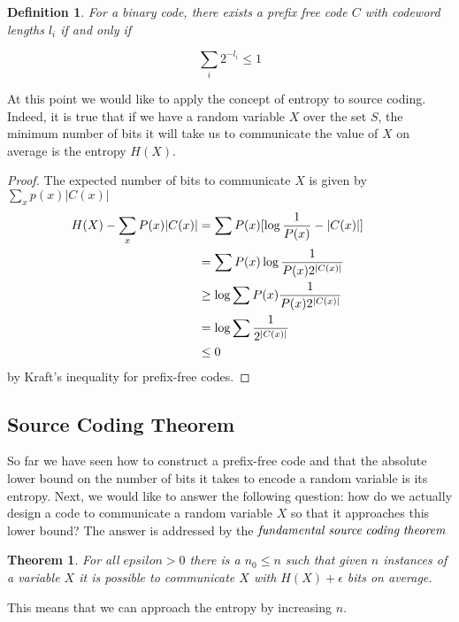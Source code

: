 \documentclass[a4paper,11pt]{book}
\newtheorem{theorem}{Theorem}
\newtheorem{definition}{Definition}
\begin{document}
\begin{definition}
For a binary code, there exists a prefix free code $C$ with codeword lengths $l_{i}$ if and only if
\end{definition}

\begin{equation}
\sum_{i} 2^{-l_{i}} \leq 1
\end{equation}

At this point we would like to apply the concept of entropy to source coding. Indeed, it is true that if we have a random variable $X$ over the set $S$, the minimum number of bits it will take us to communicate the value of $X$ on average is the entropy $H(X)$.

\begin{proof}
  The expected number of bits to communicate $X$ is given by $\sum_{x}p(x)|C(x)|$
  \begin{align*}
    H(X) - \sum_{x}P(x)|C(x)| &= \sum P(x)[\log\frac{1}{P(x)} - |C(x)|] \\
    &= \sum P(x)\log\frac{1}{P(x)2^{|C(x)|}} \\
    &\geq \log\sum P(x)\frac{1}{P(x)2^{|C(x)|}}  \\
    &= \log\sum \frac{1}{2^{|C(x)|}}  \\
    &\leq 0 &&\qedhere
  \end{align*}
  by Kraft's inequality for prefix-free codes.
\end{proof}

\subsection{Source Coding Theorem}

So far we have seen how to construct a prefix-free code and that the absolute lower bound on the number of bits it takes to encode a random variable is its entropy. Next, we would like to answer the following question: how do we actually design a code to communicate a random variable $X$ so that it approaches this lower bound?  The answer is addressed by the $\it{fundamental \; source \; coding \; theorem}$ 

\begin{theorem}
For all $epsilon > 0$ there is a $n_{0} \leq n$ such that given $n$ instances of a variable $X$ it is possible to communicate $X$ with $H(X) + \epsilon$ bits on average.
\end{theorem}

This means that we can approach the entropy by increasing $n$.
\end{document}
